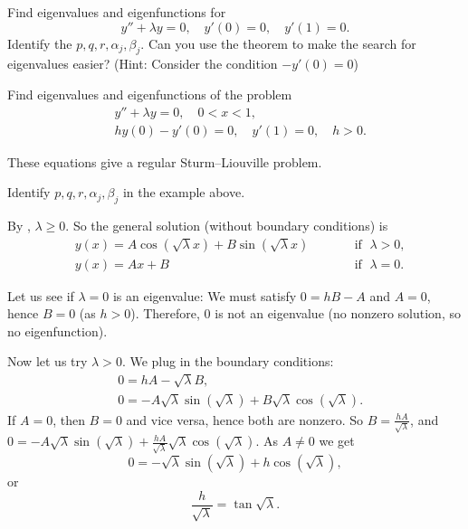 \documentclass{ximera}
\begin{document}
\begin{exercise}
    Find eigenvalues and eigenfunctions for
    \begin{equation*}
        y'' + \lambda y = 0, \quad y'(0) = 0, \quad y'(1) = 0.
    \end{equation*}
    Identify the $p, q, r, \alpha_j, \beta_j$. Can you use the theorem to make the search for eigenvalues easier? (Hint: Consider the condition $-y'(0)=0$)
\end{exercise}

\begin{example}
    Find eigenvalues and eigenfunctions of the problem
    \begin{align*}
        & y''+\lambda y = 0, \quad 0 < x < 1 , \\
        & hy(0)- y'(0) = 0, \quad y'(1)  = 0, \quad h > 0.
    \end{align*}
    
    These equations give a regular Sturm--Liouville problem.
    
    \begin{exercise}
        Identify $p, q, r, \alpha_j, \beta_j$ in the example above.
    \end{exercise}
    
    By , $\lambda \geq 0$. So the general solution (without boundary conditions) is
    \begin{equation*}
        \begin{aligned}
             & y(x) = A \cos ( \sqrt{\lambda} x) + B \sin (\sqrt{\lambda} x) & & \qquad \text{if } \; \lambda > 0 , \\
            & y(x) = A x + B & & \qquad \text{if } \; \lambda = 0 .
        \end{aligned}
    \end{equation*}
    
    Let us see if $\lambda = 0$ is an eigenvalue: We must satisfy $0 = hB - A$ and $A = 0$, hence $B=0$ (as $h > 0$). Therefore, 0 is not an eigenvalue (no nonzero solution, so no eigenfunction).
    
    Now let us try $\lambda > 0$.  We plug in the boundary conditions:
    \begin{align*}
        & 0 = h A - \sqrt{\lambda} B , \\
        & 0 = -A \sqrt{\lambda} \sin (\sqrt{\lambda}) +B \sqrt{\lambda} \cos (\sqrt{\lambda}) .
    \end{align*}
    If $A=0$, then $B=0$ and vice versa, hence both are nonzero. So $B = \frac{hA}{\sqrt{\lambda}}$, and $0 = -A \sqrt{\lambda} \sin ( \sqrt{\lambda}) + \frac{hA}{\sqrt{\lambda}} \sqrt{\lambda} \cos ( \sqrt{\lambda})$.  As $A \not= 0$ we get
    \begin{equation*}
        0 =  - \sqrt{\lambda} \sin ( \sqrt{\lambda}) + h \cos ( \sqrt{\lambda}) ,
    \end{equation*}
    or
    \begin{equation*}
        \frac{h}{\sqrt{\lambda}} = \tan \sqrt{\lambda} .
    \end{equation*}
    

\end{example}
\end{document}
